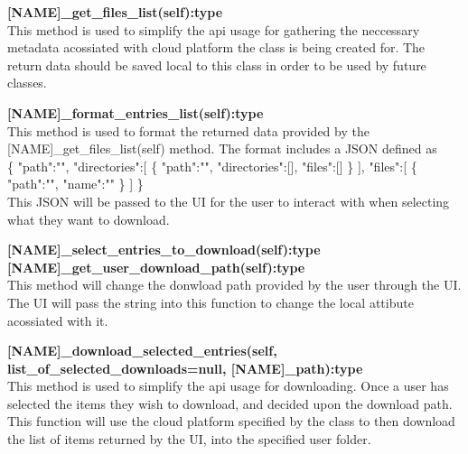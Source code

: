 \textbf{[NAME]\_get\_files\_list(self):type} \\
This method is used to simplify the api usage for gathering the neccessary metadata acossiated with cloud platform the class is being created for.
The return data should be saved local to this class in order to be used by future classes. 

\textbf{[NAME]\_format\_entries\_list(self):type} \\
This method is used to format the returned data provided by the [NAME]\_get\_files\_list(self) method. The format includes a JSON defined as 
\\
\{
   "path":"",
   "directories":[
      \{
         "path":"",
         "directories":[],
         "files":[]
      \}
   ],
   "files":[
      \{
         "path":"",
         "name":""
      \}
   ]
\}
\\
This JSON will be passed to the UI for the user to interact with when selecting what they want to download.

\textbf{[NAME]\_select\_entries\_to\_download(self):type} \\

\textbf{[NAME]\_get\_user\_download\_path(self):type} \\
This method will change the donwload path provided by the user through the UI. The UI will pass the string into this function to change the
local attibute acossiated with it.

\textbf{[NAME]\_download\_selected\_entries(self, list\_of\_selected\_downloads=null, [NAME]\_path):type} \\
​This method is used to simplify the api usage for downloading. Once a user has selected the items they wish to download, and decided upon the 
download path. This function will use the cloud platform specified by the class to then download the list of items returned by the UI, into the 
specified user folder.

